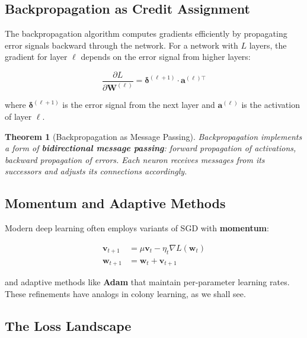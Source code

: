 \documentclass[12pt,letterpaper]{article}
\newtheorem{theorem}{Theorem}[section]
\begin{document}
\subsection{Backpropagation as Credit Assignment}

The backpropagation algorithm \citep{rumelhart1986learning} computes gradients efficiently by propagating error signals backward through the network. For a network with $L$ layers, the gradient for layer $\ell$ depends on the error signal from higher layers:

\begin{equation}
\frac{\partial L}{\partial \mathbf{W}^{(\ell)}} = \boldsymbol{\delta}^{(\ell+1)} \cdot \mathbf{a}^{(\ell)\top} \label{eq:backprop}
\end{equation}

where $\boldsymbol{\delta}^{(\ell+1)}$ is the error signal from the next layer and $\mathbf{a}^{(\ell)}$ is the activation of layer $\ell$.

\begin{theorem}[Backpropagation as Message Passing]
Backpropagation implements a form of \textbf{bidirectional message passing}: forward propagation of activations, backward propagation of errors. Each neuron receives messages from its successors and adjusts its connections accordingly.
\end{theorem}

\subsection{Momentum and Adaptive Methods}

Modern deep learning often employs variants of SGD with \textbf{momentum}:

\begin{align}
\mathbf{v}_{t+1} &= \mu \mathbf{v}_t - \eta_t \nabla L(\mathbf{w}_t) \label{eq:momentum_vel}\\
\mathbf{w}_{t+1} &= \mathbf{w}_t + \mathbf{v}_{t+1} \label{eq:momentum_update}
\end{align}

and adaptive methods like \textbf{Adam} \citep{kingma2014adam} that maintain per-parameter learning rates. These refinements have analogs in colony learning, as we shall see.

\subsection{The Loss Landscape}
\end{document}
